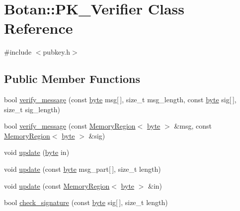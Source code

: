\hypertarget{classBotan_1_1PK__Verifier}{\section{Botan\-:\-:P\-K\-\_\-\-Verifier Class Reference}
\label{classBotan_1_1PK__Verifier}
}


{\ttfamily \#include $<$pubkey.\-h$>$}

\subsection*{Public Member Functions}
\begin{DoxyCompactItemize}
\item 
bool \hyperlink{classBotan_1_1PK__Verifier_a4896301365efb244a68b2f4b3e56afe3}{verify\-\_\-message} (const \hyperlink{namespaceBotan_a7d793989d801281df48c6b19616b8b84}{byte} msg\mbox{[}$\,$\mbox{]}, size\-\_\-t msg\-\_\-length, const \hyperlink{namespaceBotan_a7d793989d801281df48c6b19616b8b84}{byte} sig\mbox{[}$\,$\mbox{]}, size\-\_\-t sig\-\_\-length)
\item 
bool \hyperlink{classBotan_1_1PK__Verifier_a0f160cc498d2e0d4f43e65365e0da201}{verify\-\_\-message} (const \hyperlink{classBotan_1_1MemoryRegion}{Memory\-Region}$<$ \hyperlink{namespaceBotan_a7d793989d801281df48c6b19616b8b84}{byte} $>$ \&msg, const \hyperlink{classBotan_1_1MemoryRegion}{Memory\-Region}$<$ \hyperlink{namespaceBotan_a7d793989d801281df48c6b19616b8b84}{byte} $>$ \&sig)
\item 
void \hyperlink{classBotan_1_1PK__Verifier_a16bfc86a78f3bb311fd9e78c6ed50722}{update} (\hyperlink{namespaceBotan_a7d793989d801281df48c6b19616b8b84}{byte} in)
\item 
void \hyperlink{classBotan_1_1PK__Verifier_a98e1f12a6972272ee7bb3f87a8ec0b39}{update} (const \hyperlink{namespaceBotan_a7d793989d801281df48c6b19616b8b84}{byte} msg\-\_\-part\mbox{[}$\,$\mbox{]}, size\-\_\-t length)
\item 
void \hyperlink{classBotan_1_1PK__Verifier_a393ec44958f9854c9c308f26fe85683c}{update} (const \hyperlink{classBotan_1_1MemoryRegion}{Memory\-Region}$<$ \hyperlink{namespaceBotan_a7d793989d801281df48c6b19616b8b84}{byte} $>$ \&in)
\item 
bool \hyperlink{classBotan_1_1PK__Verifier_ac99869786a0e49521794c7dd5e24aa7a}{check\-\_\-signature} (const \hyperlink{namespaceBotan_a7d793989d801281df48c6b19616b8b84}{byte} sig\mbox{[}$\,$\mbox{]}, size\-\_\-t length)
\item 

\end{DoxyCompactItemize}
